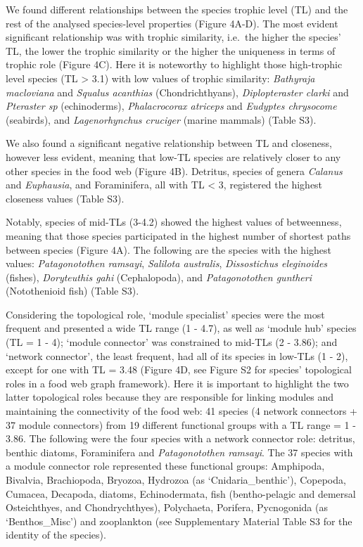 \documentclass[preprint, 3p,
authoryear]{elsarticle} %
\begin{document}
We found different relationships between the species trophic level (TL)
and the rest of the analysed species-level properties (Figure 4A-D). The
most evident significant relationship was with trophic similarity,
i.e.~the higher the species' TL, the lower the trophic similarity or the
higher the uniqueness in terms of trophic role (Figure 4C). Here it is
noteworthy to highlight those high-trophic level species (TL
\textgreater{} 3.1) with low values of trophic similarity:
\emph{Bathyraja macloviana} and \emph{Squalus acanthias}
(Chondrichthyans), \emph{Diplopteraster clarki} and \emph{Pteraster sp}
(echinoderms), \emph{Phalacrocorax atriceps} and \emph{Eudyptes
chrysocome} (seabirds), and \emph{Lagenorhynchus cruciger} (marine
mammals) (Table S3).

We also found a significant negative relationship between TL and
closeness, however less evident, meaning that low-TL species are
relatively closer to any other species in the food web (Figure 4B).
Detritus, species of genera \emph{Calanus} and \emph{Euphausia}, and
Foraminifera, all with TL \textless{} 3, registered the highest
closeness values (Table S3).

Notably, species of mid-TLs (3-4.2) showed the highest values of
betweenness, meaning that those species participated in the highest
number of shortest paths between species (Figure 4A). The following are
the species with the highest values: \emph{Patagonotothen ramsayi},
\emph{Salilota australis}, \emph{Dissostichus eleginoides} (fishes),
\emph{Doryteuthis gahi} (Cephalopoda), and \emph{Patagonotothen
guntheri} (Notothenioid fish) (Table S3).

Considering the topological role, `module specialist' species were the
most frequent and presented a wide TL range (1 - 4.7), as well as
`module hub' species (TL = 1 - 4); `module connector' was constrained to
mid-TLs (2 - 3.86); and `network connector', the least frequent, had all
of its species in low-TLs (1 - 2), except for one with TL = 3.48 (Figure
4D, see Figure S2 for species' topological roles in a food web graph
framework). Here it is important to highlight the two latter topological
roles because they are responsible for linking modules and maintaining
the connectivity of the food web: 41 species (4 network connectors + 37
module connectors) from 19 different functional groups with a TL range =
1 - 3.86. The following were the four species with a network connector
role: detritus, benthic diatoms, Foraminifera and \emph{Patagonotothen
ramsayi}. The 37 species with a module connector role represented these
functional groups: Amphipoda, Bivalvia, Brachiopoda, Bryozoa, Hydrozoa
(as `Cnidaria\_benthic'), Copepoda, Cumacea, Decapoda, diatoms,
Echinodermata, fish (bentho-pelagic and demersal Osteichthyes, and
Chondrychthyes), Polychaeta, Porifera, Pycnogonida (as `Benthos\_Misc')
and zooplankton (see Supplementary Material Table S3 for the identity of
the species).
\end{document}
